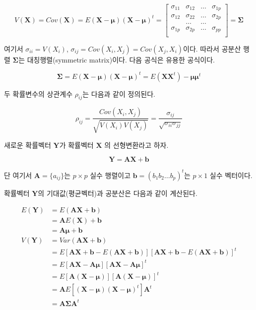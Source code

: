 \documentclass[
  11pt,
  a4paper,
  oneside]{scrbook}
\begin{document}
\[
V(\pmb X) =Cov(\pmb X) = E (\pmb X-\pmb \mu) (\pmb X-\pmb \mu)^t 
= 
  \begin{bmatrix}
\sigma_{11} & \sigma_{12} & \dots & \sigma_{1p} \\
\sigma_{12} & \sigma_{22} & \dots & \sigma_{2p} \\
& \dots & \dots & \\
\sigma_{1p} & \sigma_{2p} & \dots & \sigma_{pp} \\
\end{bmatrix}
= \pmb \Sigma
\]

여기서 \(\sigma_{ii}=V(X_i)\),
\(\sigma_{ij} = Cov(X_i, X_j)=Cov(X_j, X_i)\)이다. 따라서 공분산 행렬
\(\pmb \Sigma\)는 대칭행렬(symmetric matrix)이다. 다음 공식은 유용한
공식이다.

\[ \pmb \Sigma = E (\pmb X-\pmb \mu) (\pmb X-\pmb \mu)^t  = E(\pmb X \pmb X^t)-\pmb \mu \pmb \mu^t \]

두 확률변수의 상관계수 \(\rho_{ij}\)는 다음과 같이 정의된다.

\[ \rho_{ij} = \frac{Cov(X_i, X_j)}{ \sqrt{V(X_i) V(X_j)}} = \frac{\sigma_{ij}}{\sqrt{\sigma_{ii}
  \sigma_{jj}}} \]

새로운 확률벡터 \(\pmb Y\)가 확률벡터 \(\pmb X\) 의 선형변환라고 하자.

\[ \pmb Y = \pmb A  \pmb X + \pmb b \]

단 여기서 \(\pmb A = \{ a_{ij} \}\)는 \(p \times p\) 실수 행렬이고
\(\pmb b =(b_1 b_2 \dots b_p)^t\)는 \(p \times 1\) 실수 벡터이다.

확률벡터 \(\pmb Y\)의 기대값(평균벡터)과 공분산은 다음과 같이 계산된다.

\[
\begin{aligned}
E(\pmb Y ) &= E(\pmb A \pmb X+ \pmb b) \\
&= \pmb A E(\pmb X)+ \pmb b \\
&= \pmb A \pmb \mu+ \pmb b \\
V(\pmb Y) &= Var(\pmb A \pmb X+ \pmb b) \\
&= E[\pmb A \pmb X+ \pmb b -E(\pmb A \pmb X+ \pmb b)] [\pmb A \pmb X+ \pmb b -E(\pmb A \pmb X+ \pmb b)]^t \\
&= E[\pmb A \pmb X -  \pmb A \pmb \mu] [\pmb A \pmb X -  \pmb A \pmb \mu]^t \\
&= E[\pmb A (\pmb X - \pmb \mu)] [\pmb A (\pmb X - \pmb \mu)]^t \\
&= \pmb A E [(\pmb X - \pmb \mu) (\pmb X - \pmb \mu)^t] \pmb A^t \\
&= \pmb A \pmb \Sigma \pmb A^t
\end{aligned}
\]
\end{document}
